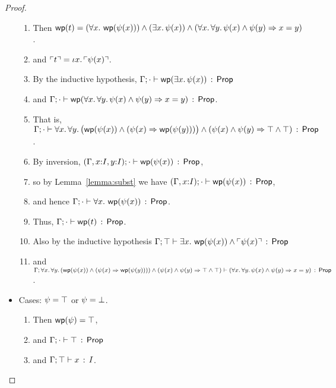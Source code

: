 \documentclass[11pt]{article}
\begin{document}
\begin{proof}
\begin{itemize}
    \begin{enumerate}
      \item 
        Then
        $\mathop{\mathsf{wp}}(t) = 
        (\forall x.\, \mathop{\mathsf{wp}}(\psi(x))) \wedge (\exists x.\, \psi(x)) \wedge (\forall x.\, \forall y.\, \psi(x) \wedge \psi(y) \Rightarrow x=y)$.
      \item
        and 
        	$\ulcorner t \urcorner = \iota x.\, \ulcorner \psi(x) \urcorner$.
      \item 
        By the inductive hypothesis, $\Gamma;\cdot \vdash \mathop{\mathsf{wp}}(\exists x.\, \psi(x))\, :\, \mathsf{Prop}$
      \item 
      	and
        $\Gamma;\cdot \vdash \mathop{\mathsf{wp}}(\forall x.\, \forall y.\, \psi(x) \wedge \psi(y) \Rightarrow x=y)\, :\, \mathsf{Prop}$.
      \item
      	That is, 
	$\Gamma;\cdot \vdash \forall x.\, \forall y.\, \bigl(\mathop{\mathsf{wp}}(\psi(x)) \wedge (\psi(x) \Rightarrow \mathop{\mathsf{wp}}(\psi(y)))\bigr) \wedge (\psi(x) \wedge \psi(y) \Rightarrow \top \wedge \top)\, :\, \mathsf{Prop}$.
	  \item
	    By inversion, 
	      $(\Gamma,x{:}I,y{:}I);\cdot \vdash \mathop{\mathsf{wp}}(\psi(x))\, :\, \mathsf{Prop}$,
      \item 
        so by Lemma~\ref{lemma:subst} we have 
        $(\Gamma,x{:}I);\cdot \vdash \mathop{\mathsf{wp}}(\psi(x))\, :\, \mathsf{Prop}$,
      \item
        and hence $\Gamma;\cdot \vdash \forall x.\, \mathop{\mathsf{wp}}(\psi(x))\, :\, \mathsf{Prop}$.
      \item
        Thus, $\Gamma;\cdot \vdash \mathop{\mathsf{wp}}(t)\, :\, \mathsf{Prop}$.
      \item
        Also by the inductive hypothesis
        $\Gamma;\top \vdash \exists x.\, \mathop{\mathsf{wp}}(\psi(x)) \wedge \ulcorner \psi(x) \urcorner\, :\, \mathsf{Prop}$
      \item
        and 
        $\Gamma;\forall x.\, \forall y.\, (\mathop{\mathsf{wp}}(\psi(x)) \wedge (\psi(x) \Rightarrow \mathop{\mathsf{wp}}(\psi(y)))) \wedge (\psi(x) \wedge \psi(y) \Rightarrow \top \wedge \top) \vdash (\forall x.\, \forall y.\, \psi(x) \wedge \psi(y) \Rightarrow x=y)\, :\, \mathsf{Prop}$.
      \end{enumerate}
      
  \item Cases: $\psi = \top$ or $\psi = \bot$.
      \begin{enumerate}
      \item 
      	Then $\mathop{\mathsf{wp}}(\psi) = \top$,
      \item
        and $\Gamma;\cdot \vdash \top\, :\, \mathsf{Prop}$ 
      \item
        and $\Gamma;\top \vdash x\, :\, I$.
      \end{enumerate}
      

\end{itemize}
\end{proof}
\end{document}

